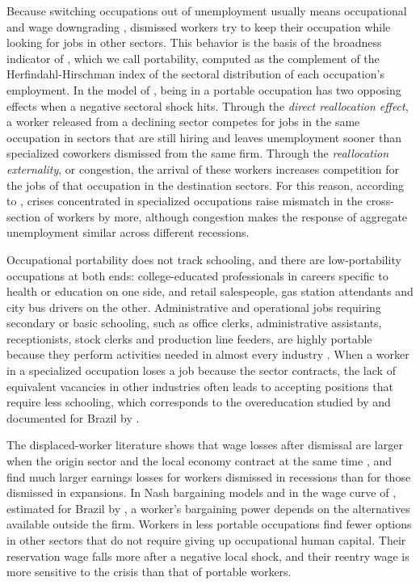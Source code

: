 \documentclass[11pt,a4paper]{article}
\let\citetorig\citet
\let\citeporig\citep
\renewcommand{\citet}[1]{{\color{citeblue}\citetorig{#1}}}
\renewcommand{\citep}[1]{{\color{citeblue}\citeporig{#1}}}
\begin{document}
Because switching occupations out of unemployment usually means occupational and wage downgrading \citep{longhi2013, wiczer2015, carrillotudela2023}, dismissed workers try to keep their occupation while looking for jobs in other sectors. This behavior is the basis of the broadness indicator of \citet{darougheh2022, darougheh2024}, which we call portability, computed as the complement of the Herfindahl-Hirschman index of the sectoral distribution of each occupation's employment. In the model of \citet{darougheh2024}, being in a portable occupation has two opposing effects when a negative sectoral shock hits. Through the \emph{direct reallocation effect}, a worker released from a declining sector competes for jobs in the same occupation in sectors that are still hiring and leaves unemployment sooner than specialized coworkers dismissed from the same firm. Through the \emph{reallocation externality}, or congestion, the arrival of these workers increases competition for the jobs of that occupation in the destination sectors. For this reason, according to \citet{darougheh2024}, crises concentrated in specialized occupations raise mismatch in the cross-section of workers by more, although congestion makes the response of aggregate unemployment similar across different recessions.

Occupational portability does not track schooling, and there are low-portability occupations at both ends: college-educated professionals in careers specific to health or education on one side, and retail salespeople, gas station attendants and city bus drivers on the other. Administrative and operational jobs requiring secondary or basic schooling, such as office clerks, administrative assistants, receptionists, stock clerks and production line feeders, are highly portable because they perform activities needed in almost every industry \citep{gathmann2010, darougheh2024}. When a worker in a specialized occupation loses a job because the sector contracts, the lack of equivalent vacancies in other industries often leads to accepting positions that require less schooling, which corresponds to the overeducation studied by \citet{sicherman1991} and documented for Brazil by \citet{marioni2021}.

The displaced-worker literature shows that wage losses after dismissal are larger when the origin sector and the local economy contract at the same time \citep{jacobson1993, carrington1993, couch2010}, and \citet{davis2011} find much larger earnings losses for workers dismissed in recessions than for those dismissed in expansions. In Nash bargaining models and in the wage curve of \citet{blanchflower1994, blanchflower2005}, estimated for Brazil by \citet{barros1997td}, a worker's bargaining power depends on the alternatives available outside the firm. Workers in less portable occupations find fewer options in other sectors that do not require giving up occupational human capital. Their reservation wage falls more after a negative local shock, and their reentry wage is more sensitive to the crisis than that of portable workers.
\end{document}
